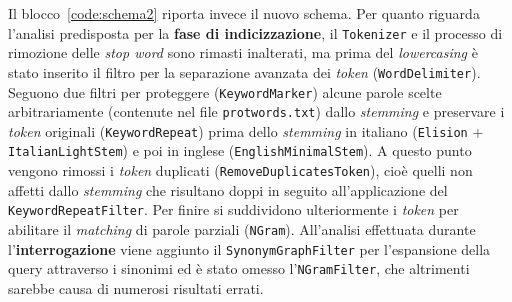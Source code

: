 
Il blocco~\ref{code:schema2} riporta invece il nuovo schema. \newline
Per quanto riguarda l'analisi predisposta per la \textbf{fase di indicizzazione}, il \texttt{Tokenizer} e il processo di rimozione delle \textit{stop word} sono rimasti inalterati, ma prima del \textit{lowercasing} è stato inserito il filtro per la separazione avanzata dei \textit{token} (\texttt{WordDelimiter}). Seguono due filtri per proteggere (\texttt{KeywordMarker}) alcune parole scelte arbitrariamente (contenute nel file \texttt{protwords.txt}) dallo \textit{stemming} e preservare i \textit{token} originali (\texttt{KeywordRepeat}) prima dello \textit{stemming} in italiano (\texttt{Elision} + \texttt{ItalianLightStem}) e poi in inglese (\texttt{EnglishMinimalStem}). A questo punto vengono rimossi i \textit{token} duplicati (\texttt{RemoveDuplicatesToken}), cioè quelli non affetti dallo \textit{stemming} che risultano doppi in seguito all’applicazione del \texttt{KeywordRepeatFilter}. Per finire si suddividono ulteriormente i \textit{token} per abilitare il \textit{matching} di parole parziali (\texttt{NGram}). \newline
All'analisi effettuata durante l'\textbf{interrogazione} viene aggiunto il \texttt{SynonymGraphFilter} per l’espansione della query attraverso i sinonimi ed è stato omesso l’\texttt{NGramFilter}, che altrimenti sarebbe causa di numerosi risultati errati.

